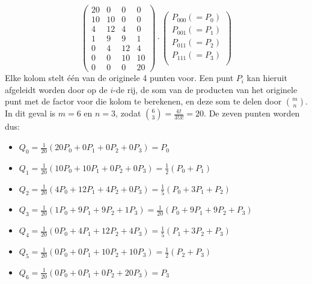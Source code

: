 \documentclass{report}
\begin{document}
\begin{itemize}
{\begin{itemize}
$$\begin{pmatrix}
				20 & 0  & 0  & 0  \\ 
				10 & 10 & 0  & 0  \\ 
				4  & 12 & 4  & 0  \\ 
				1  & 9  & 9  & 1  \\ 
				0  & 4  & 12 & 4  \\ 
				0  & 0  & 10 & 10 \\ 
				0  & 0  & 0  & 20 
			\end{pmatrix}
			\cdot 
			\begin{pmatrix}
				P_{000} (=P_0)\\
				P_{001} (=P_1)\\
				P_{011} (=P_2)\\
				P_{111} (=P_3)\\
			\end{pmatrix}
			$$
			Elke kolom stelt één van de originele 4 punten voor. Een punt $P_i$ kan hieruit afgeleidt worden door op de $i$-de rij, de som van 
			de producten van het originele punt met de factor voor die kolom te berekenen, en deze som te delen door $\binom{m}{n}$. In dit geval is $m = 6$ en $n = 3$, zodat $\binom{6}{3} = \frac{6!}{3! 3!} = 20$. De zeven punten worden dus:
			\begin{itemize}
				\item $Q_0 = \frac{1}{20} (20P_0 + 0P_1  + 0P_2  + 0P_3) = P_0$
				\item $Q_1 = \frac{1}{20}(10P_0 + 10P_1 + 0P_2  + 0P_3) = \frac{1}{2}(P_0 + P_1)$ 
				\item $Q_2 = \frac{1}{20}(4P_0  + 12P_1 + 4P_2  + 0P_3) = \frac{1}{5}(P_0  + 3P_1 + P_2)$
				\item $Q_3 = \frac{1}{20}(1P_0  + 9P_1 + 9P_2  + 1P_3) = \frac{1}{20}(P_0 + 9P_1  + 9P_2 + P_3)$
				\item $Q_4 = \frac{1}{20}(0P_0  + 4P_1 + 12P_2  + 4P_3) = \frac{1}{5}(P_1  + 3P_2 + P_3)$
				\item $Q_5 = \frac{1}{20}(0P_0  + 0P_1 + 10P_2  + 10P_3) = \frac{1}{2}(P_2 + P_3)$
				\item $Q_6 = \frac{1}{20}(0P_0  + 0P_1 + 0P_2  + 20P_3) = P_3$
			\end{itemize}		
		\end{itemize}}
\end{itemize}
\end{document}

